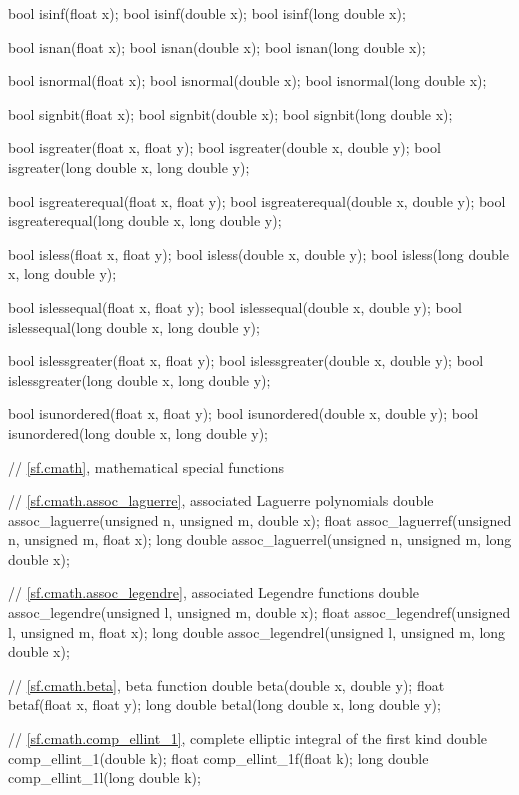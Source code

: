 \begin{codeblock}
{  bool isinf(float x);
  bool isinf(double x);
  bool isinf(long double x);

  bool isnan(float x);
  bool isnan(double x);
  bool isnan(long double x);

  bool isnormal(float x);
  bool isnormal(double x);
  bool isnormal(long double x);

  bool signbit(float x);
  bool signbit(double x);
  bool signbit(long double x);

  bool isgreater(float x, float y);
  bool isgreater(double x, double y);
  bool isgreater(long double x, long double y);

  bool isgreaterequal(float x, float y);
  bool isgreaterequal(double x, double y);
  bool isgreaterequal(long double x, long double y);

  bool isless(float x, float y);
  bool isless(double x, double y);
  bool isless(long double x, long double y);

  bool islessequal(float x, float y);
  bool islessequal(double x, double y);
  bool islessequal(long double x, long double y);

  bool islessgreater(float x, float y);
  bool islessgreater(double x, double y);
  bool islessgreater(long double x, long double y);

  bool isunordered(float x, float y);
  bool isunordered(double x, double y);
  bool isunordered(long double x, long double y);

  // \ref{sf.cmath}, mathematical special functions

  // \ref{sf.cmath.assoc_laguerre}, associated Laguerre polynomials
  double       assoc_laguerre(unsigned n, unsigned m, double x);
  float        assoc_laguerref(unsigned n, unsigned m, float x);
  long double  assoc_laguerrel(unsigned n, unsigned m, long double x);

  // \ref{sf.cmath.assoc_legendre}, associated Legendre functions
  double       assoc_legendre(unsigned l, unsigned m, double x);
  float        assoc_legendref(unsigned l, unsigned m, float x);
  long double  assoc_legendrel(unsigned l, unsigned m, long double x);

  // \ref{sf.cmath.beta}, beta function
  double       beta(double x, double y);
  float        betaf(float x, float y);
  long double  betal(long double x, long double y);

  // \ref{sf.cmath.comp_ellint_1}, complete elliptic integral of the first kind
  double       comp_ellint_1(double k);
  float        comp_ellint_1f(float k);
  long double  comp_ellint_1l(long double k);

}
\end{codeblock}
